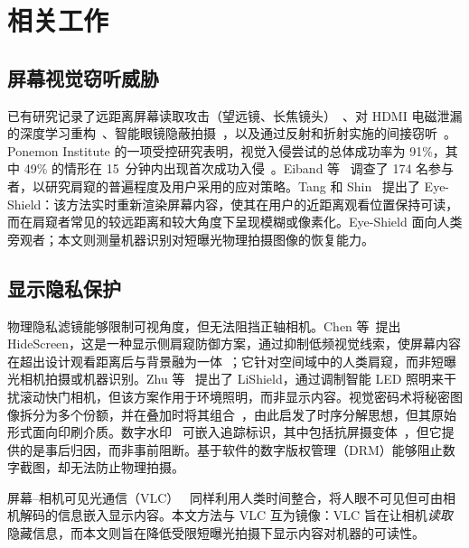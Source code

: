 \documentclass{ieeeaccess}
\begin{document}
\section{相关工作}
\label{sec:related}

\subsection{屏幕视觉窃听威胁}

已有研究记录了远距离屏幕读取攻击（望远镜、长焦镜头）~\cite{b_backes2009}、对 HDMI 电磁泄漏的深度学习重构~\cite{b_fernandez2024}、智能眼镜隐蔽拍摄~\cite{b_wang2026}，以及通过反射和折射实施的间接窃听~\cite{b_raguram2011}。Ponemon Institute 的一项受控研究表明，视觉入侵尝试的总体成功率为 91\%，其中 49\% 的情形在 15~分钟内出现首次成功入侵~\cite{b_ponemon2016}。Eiband 等~\cite{b_eiband2017} 调查了 174 名参与者，以研究肩窥的普遍程度及用户采用的应对策略。Tang 和 Shin~\cite{b_tang2023} 提出了 Eye-Shield：该方法实时重新渲染屏幕内容，使其在用户的近距离观看位置保持可读，而在肩窥者常见的较远距离和较大角度下呈现模糊或像素化。Eye-Shield 面向人类旁观者；本文则测量机器识别对短曝光物理拍摄图像的恢复能力。

\subsection{显示隐私保护}

物理隐私滤镜能够限制可视角度，但无法阻挡正轴相机。Chen 等\ 提出 HideScreen，这是一种显示侧肩窥防御方案，通过抑制低频视觉线索，使屏幕内容在超出设计观看距离后与背景融为一体~\cite{b_hidescreen2019}；它针对空间域中的人类肩窥，而非短曝光相机拍摄或机器识别。Zhu 等~\cite{b_zhu2017} 提出了 LiShield，通过调制智能 LED 照明来干扰滚动快门相机，但该方案作用于环境照明，而非显示内容。视觉密码术将秘密图像拆分为多个份额，并在叠加时将其组合~\cite{b_naor1994}，由此启发了时序分解思想，但其原始形式面向印刷介质。数字水印~\cite{b_zhong2023} 可嵌入追踪标识，其中包括抗屏摄变体~\cite{b_fang2019}，但它提供的是事后归因，而非事前阻断。基于软件的数字版权管理（DRM）能够阻止数字截图，却无法防止物理拍摄。

屏幕--相机可见光通信（VLC）~\cite{b_nguyen2016,b_tran2021,b_ghiasi2024} 同样利用人类时间整合，将人眼不可见但可由相机解码的信息嵌入显示内容。本文方法与 VLC 互为镜像：VLC 旨在让相机\emph{读取}隐藏信息，而本文则旨在降低受限短曝光拍摄下显示内容对机器的可读性。
\end{document}
